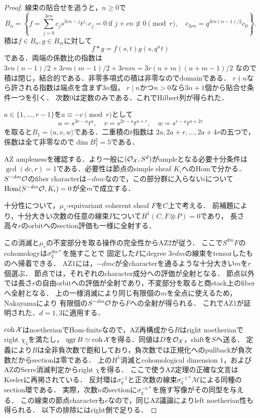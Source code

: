 \documentclass[11pt,a4paper]{ltjsarticle}
\begin{document}
\begin{proof}
線束の貼合せを追うと，$n\geq0$で
\[
 B_n=\left\{
 f=\sum_{j=0}^{3rn}c_js^{3rn-j}t^j:
 c_j=0\ \text{if }j+cn\not\equiv0\pmod r,\quad
 c_{3rn}=q^{3rn(n-1)/2}c_0
 \right\}.
\]
積は$f\in B_n,g\in B_m$に対して
\[
 f*g=f(s,t)g(s,q^nt)
\]
である．両端の係数比の指数は
$3rn(n-1)/2+3rm(m-1)/2+3rnm=3r(n+m)(n+m-1)/2$
なので積は閉じ，結合的である．非零多項式の積は非零なのでdomainである．
$r\nmid n$なら許される指数は端点を含まず$3n$個，
$r\mid n$かつ$n>0$なら$3n+1$個から貼合せ条件一つを引く．
次数$0$は定数のみである．これでHilbert列が得られた．

$a\in\{1,\ldots,r-1\}$を$a\equiv-c\pmod r$として
\[
 u=s^{3r-a}t^a,\quad v=s^{2r-a}t^{a+r},\quad
 w=s^{r-a}t^{a+2r}
\]
を取ると$B_1=\langle u,v,w\rangle$である．二重積の$t$指数は
$2a,2a+r,\ldots,2a+4r$の五つで，係数は全て非零なので$\dim B_1^2=5$である．

AZ amplenessを確認する．より一般に$(\mathcal O_{\mathcal X},S^d)$がampleとなる必要十分条件は
$\gcd(dc,r)=1$である．必要性は節点のsimple sheaf $K_i$へのHomで分かる．
$S^{-dm}\mathcal O$のfiber characterは$-dmc$なので，この部分群に入らない$i$について
$\operatorname{Hom}(S^{-dm}\mathcal O,K_i)=0$が全$m$で成立する．

十分性について，$\mu_r$-equivariant coherent sheaf $F$を$C$上で考える．
前補題により，十分大きい次数の任意の線束$P$について$H^1(C,F\otimes P)=0$であり，
長さ高々$r$のorbitへのsection評価も一様に全射する．

この消滅と$\mu_r$の不変部分を取る操作の完全性からAZ2が従う．
ここで$S^{dm}F$のcohomologyは$\sigma_q^{dm*}$を施すことで
固定した$F$にdegree $3rdm$の線束をtensorしたものへ帰着できる．
AZ1には，$-dmc$が全characterを通るような十分大きい$m$を$r$個選ぶ．
節点では，それぞれのcharacter成分への評価が全射となる．
節点以外では長さ$r$の自由orbitへの評価が全射であり，不変部分を取ると商stack上のfiberへ全射となる．
上の一様消滅により同じ有限個の$m$を全点に使えるため，Nakayamaにより
有限個の$S^{-dm}\mathcal O$から$F$への全射が得られる．
これでAZ1が証明された．$d=1,3$に適用する．

$\operatorname{coh}\mathcal X$はnoetherianでHom-finiteなので，AZ再構成から$B$はright noetherianでright $\chi_1$を満たし，
$\operatorname{qgr} B\simeq\operatorname{coh}\mathcal X$を得る．同値は$D$を$\mathcal O_{\mathcal X}$，shiftを$S$へ送る．
定義により$B$は全非負次数で飽和しており，負次数では正規化へのpullbackが負次数だからsectionは零である．
上の$H^1$消滅とcohomological dimension $1$，およびAZのSerre消滅判定からright $\chi$を得る．
ここで使うAZ定理の正確な文言はKeeler\cite[Theorems 2.3, 2.5, pp.~3--4]{Keeler}に再掲されている．
反対環は$\sigma_q^{-1}$と正次数の線束$\sigma_q^{-1*}\mathcal M$による同種のsection環である．
実際，次数$n$のsectionに$\sigma_q^{-n*}$を施す写像がその同型を与える．
この線束の節点characterも$c$なので，同じAZ議論によりleft noetherian性も得られる．
以下の排除にはright側で足りる．


\end{proof}
\end{document}
